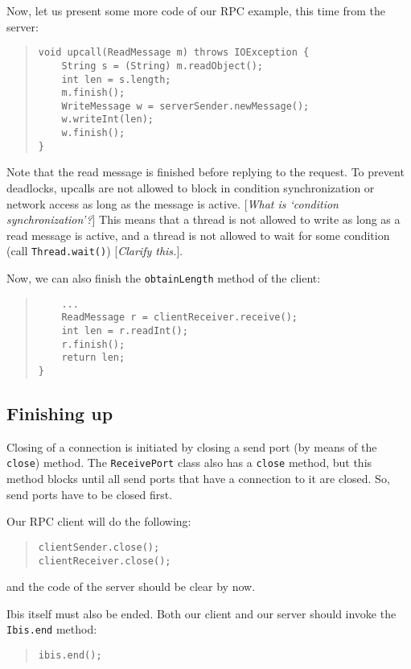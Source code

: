 \documentclass[10pt]{article}
\newcommand{\remark}[1]{[\emph{#1}]}
\begin{document}
Now, let us present some more code of our RPC example, this time
from the server:

\begin{quote}
\begin{verbatim}
void upcall(ReadMessage m) throws IOException {
    String s = (String) m.readObject();
    int len = s.length;
    m.finish();
    WriteMessage w = serverSender.newMessage();
    w.writeInt(len);
    w.finish();
}
\end{verbatim}
\end{quote}

Note that the read message is finished before replying to the
request. To prevent deadlocks, upcalls are not allowed to block in
condition synchronization or network access as long as the message
is active. \remark{What is `condition synchronization'?} This means that a thread is not allowed to write as long
as a read message is active, and a thread is not allowed to wait for
some condition (call \verb+Thread.wait()+) \remark{Clarify this.}.

Now, we can also finish the \verb+obtainLength+ method of the client:
\begin{quote}
\begin{verbatim}
    ...
    ReadMessage r = clientReceiver.receive();
    int len = r.readInt();
    r.finish();
    return len;
}
\end{verbatim}
\end{quote}

\subsection{Finishing up}

Closing of a connection is initiated by closing a send port
(by means of the \verb+close+) method. The \verb+ReceivePort+
class also has a \verb+close+ method, but this method blocks
until all send ports that have a connection to it are closed.
So, send ports have to be closed first.

Our RPC client will do the following:

\begin{quote}
\begin{verbatim}
clientSender.close();
clientReceiver.close();
\end{verbatim}
\end{quote}
and the code of the server should be clear by now.

Ibis itself must also be ended. Both our client and our server
should invoke the \verb+Ibis.end+ method:
\begin{quote}
\begin{verbatim}
ibis.end();
\end{verbatim}
\end{quote}
\end{document}
